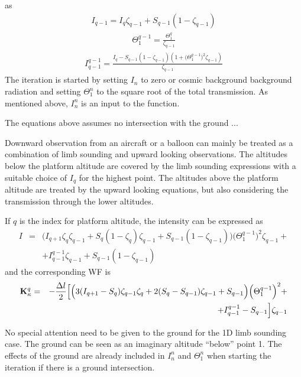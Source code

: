  as
 \begin{eqnarray}
   I_{q-1} = I_q\zeta_{q-1} + S_{q-1}(1-\zeta_{q-1}) \nonumber
 \end{eqnarray}
 \begin{eqnarray}
   \Theta_{1}^{q-1} =  \frac{\Theta_{1}^{q}}{\zeta_{q-1}} \nonumber
 \end{eqnarray}
 \begin{eqnarray}
   I_{q-1}^{q-1} = \frac{I_q - S_{q-1}(1-\zeta_{q-1})
       (1+\big(\Theta^{q-1}_{1}\big)^2\zeta_{q-1})}{\zeta_{q-1}} \nonumber
 \end{eqnarray}
 The iteration is started by setting $I_n$ to zero or cosmic background
 background radiation and setting $\Theta^n_1$ to the square root of the
 total transmission. As mentioned above, $I_n^n$ is an input to the 
 function.

 The equations above assumes no intersection with the ground ...

 

  \label{sec:wfuns:down}
  Downward observation from an aircraft or a balloon can mainly be
  treated as a combination of limb sounding and upward looking
  observations.  The altitudes below the platform altitude are covered
  by the limb sounding expressions with a suitable choice of $I_q$ for
  the highest point. The altitudes above the platform altitude are
  treated by the upward looking equations, but also considering the
  transmission through the lower altitudes. 
  
  If $q$ is the index for platform altitude, the intensity can be
  expressed as
  \begin{eqnarray}
   I &=& \Big(I_{q+1}\zeta_q\zeta_{q-1} +S_q(1-\zeta_q)\zeta_{q-1} + 
           S_{q-1}(1-\zeta_{q-1})\Big)\Big(\Theta^{q-1}_{1}\Big)^2
           \zeta_{q-1} + \nonumber \\
      & & + I_{q-1}^{q-1}\zeta_{q-1} + S_{q-1}(1-\zeta_{q-1})
    \label{eq:wfuns:idown}
  \end{eqnarray}
  and the corresponding WF is
  \begin{eqnarray}
   \mathbf{K}_{\kappa}^q& = & -\frac{\Delta l}{2}\Big[\Big(3(I_{q+1}-S_q)
           \zeta_{q-1}\zeta_q+ 2(S_q-S_{q-1})\zeta_{q-1} + S_{q-1} \Big)
           \Big(\Theta^{q-1}_{1}\Big)^2 + \nonumber \\
      & &  + I_{q-1}^{q-1}-S_{q-1}\Big]\zeta_{q-1}
  \end{eqnarray}

 No special attention need to be given to the ground for the 1D limb
 sounding case. The ground can be seen as an imaginary altitude 
 ``below'' point 1. The effects of the ground are already included in
 $I_n^n$ and $\Theta^n_1$ when starting the iteration if there is a
 ground intersection.


